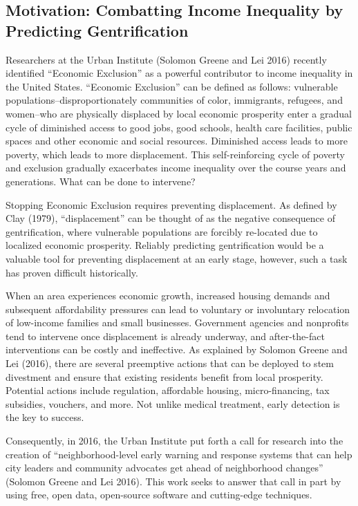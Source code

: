 \documentclass[12pt,]{article}
\begin{document}
\hypertarget{motivation-combatting-income-inequality-by-predicting-gentrification}{%
\subsection{Motivation: Combatting Income Inequality by Predicting
Gentrification}\label{motivation-combatting-income-inequality-by-predicting-gentrification}}

Researchers at the Urban Institute (Solomon Greene and Lei 2016)
recently identified ``Economic Exclusion'' as a powerful contributor to
income inequality in the United States. ``Economic Exclusion'' can be
defined as follows: vulnerable populations--disproportionately
communities of color, immigrants, refugees, and women--who are
physically displaced by local economic prosperity enter a gradual cycle
of diminished access to good jobs, good schools, health care facilities,
public spaces and other economic and social resources. Diminished access
leads to more poverty, which leads to more displacement. This
self-reinforcing cycle of poverty and exclusion gradually exacerbates
income inequality over the course years and generations. What can be
done to intervene?

Stopping Economic Exclusion requires preventing displacement. As defined
by Clay (1979), ``displacement'' can be thought of as the negative
consequence of gentrification, where vulnerable populations are forcibly
re-located due to localized economic prosperity. Reliably predicting
gentrification would be a valuable tool for preventing displacement at
an early stage, however, such a task has proven difficult historically.

When an area experiences economic growth, increased housing demands and
subsequent affordability pressures can lead to voluntary or involuntary
relocation of low-income families and small businesses. Government
agencies and nonprofits tend to intervene once displacement is already
underway, and after-the-fact interventions can be costly and
ineffective. As explained by Solomon Greene and Lei (2016), there are
several preemptive actions that can be deployed to stem divestment and
ensure that existing residents benefit from local prosperity. Potential
actions include regulation, affordable housing, micro-financing, tax
subsidies, vouchers, and more. Not unlike medical treatment, early
detection is the key to success.

Consequently, in 2016, the Urban Institute put forth a call for research
into the creation of ``neighborhood-level early warning and response
systems that can help city leaders and community advocates get ahead of
neighborhood changes'' (Solomon Greene and Lei 2016). This work seeks to
answer that call in part by using free, open data, open-source software
and cutting-edge techniques.
\end{document}
